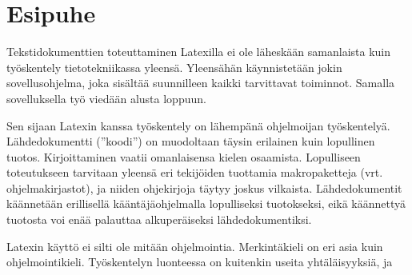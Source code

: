 \chapter*{Esipuhe}


Tekstidokumenttien toteuttaminen Latexilla ei ole läheskään samanlaista
kuin työskentely tietotekniikassa yleensä. Yleensähän käynnistetään
jokin sovellus\-ohjelma, joka sisältää suunnilleen kaikki tarvittavat
toiminnot. Samalla sovelluksella työ viedään alusta loppuun.

Sen sijaan Latexin kanssa työskentely on lähempänä ohjelmoijan
työskentelyä. Lähdedokumentti (''koodi'') on muodoltaan täysin erilainen
kuin lopullinen tuotos. Kirjoittaminen vaatii omanlaisensa kielen
osaamista. Lopulliseen toteutukseen tarvitaan yleensä eri tekijöiden
tuottamia makropaketteja (vrt. ohjelmakirjastot), ja niiden ohjekirjoja
täytyy joskus vilkaista. Lähdedokumentit käännetään erillisellä
kääntäjäohjelmalla lopulliseksi tuotokseksi, eikä käännettyä tuotosta
voi enää palauttaa alkuperäiseksi lähdedokumentiksi.

Latexin käyttö ei silti ole mitään ohjelmointia. Merkintäkieli on eri
asia kuin ohjelmointikieli. Työskentelyn luonteessa on kuitenkin useita
yhtäläisyyksiä, ja

